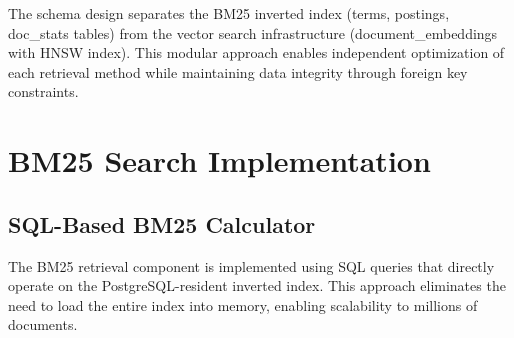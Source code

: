 The schema design separates the BM25 inverted index (terms, postings, doc\_stats tables) from the vector search infrastructure (document\_embeddings with HNSW index). This modular approach enables independent optimization of each retrieval method while maintaining data integrity through foreign key constraints.

\clearpage

\section{BM25 Search Implementation}

\subsection{SQL-Based BM25 Calculator}

The BM25 retrieval component is implemented using SQL queries that directly operate on the PostgreSQL-resident inverted index. This approach eliminates the need to load the entire index into memory, enabling scalability to millions of documents.

